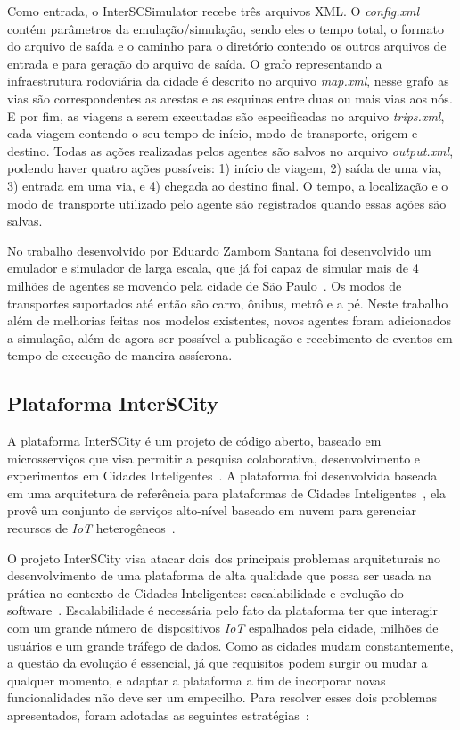 Como entrada, o InterSCSimulator recebe três arquivos XML. O \textit{config.xml} contém parâmetros da emulação/simulação, sendo eles o tempo total, o formato do
arquivo de saída e o caminho para o diretório contendo os outros arquivos de entrada e para geração do arquivo de saída.
O grafo representando a infraestrutura rodoviária da cidade é descrito no arquivo \textit{map.xml}, nesse grafo as vias são correspondentes as arestas e as esquinas entre
duas ou mais vias aos nós.
E por fim, as viagens a serem executadas são especificadas no arquivo \textit{trips.xml}, cada viagem contendo o seu tempo de início, modo de transporte, origem e destino.
Todas as ações realizadas pelos agentes são salvos no arquivo \textit{output.xml}, podendo haver quatro ações possíveis: 1) início de viagem, 2) saída de uma via,
3) entrada em uma via, e 4) chegada ao destino final.
O tempo, a localização e o modo de transporte utilizado pelo agente são registrados quando essas ações são salvas.

No trabalho desenvolvido por Eduardo Zambom Santana foi desenvolvido um emulador e simulador de larga escala, que já foi capaz de simular mais de 4 milhões de
agentes se movendo pela cidade de São Paulo~\cite{santana_17}.
Os modos de transportes suportados até então são carro, ônibus, metrô e a pé.
Neste trabalho além de melhorias feitas nos modelos existentes, novos agentes foram adicionados a simulação, além de agora ser possível a publicação e recebimento de
eventos em tempo de execução de maneira assícrona.

\subsection{Plataforma InterSCity}
\label{sec:interscity}

A plataforma InterSCity é um projeto de código aberto, baseado em microsserviços que visa permitir a pesquisa colaborativa, desenvolvimento e experimentos em Cidades
Inteligentes~\cite{arthur_17}.
A plataforma foi desenvolvida baseada em uma arquitetura de referência para plataformas de Cidades Inteligentes~\cite{santana_2016}, ela provê um conjunto de serviços
alto-nível baseado em nuvem para gerenciar recursos de \textit{IoT} heterogêneos~\cite{arthur_17}.

O projeto InterSCity visa atacar dois dos principais problemas arquiteturais no desenvolvimento de uma plataforma de alta qualidade que possa ser usada na prática no
contexto de Cidades Inteligentes: escalabilidade e evolução do software~\cite{arthur_17}.
Escalabilidade é necessária pelo fato da plataforma ter que interagir com um grande número de dispositivos \textit{IoT} espalhados pela cidade, milhões de usuários e
um grande tráfego de dados.
Como as cidades mudam constantemente, a questão da evolução é essencial, já que requisitos podem surgir ou mudar a qualquer momento, e adaptar a plataforma a fim de
incorporar novas funcionalidades não deve ser um empecilho.
Para resolver esses dois problemas apresentados, foram adotadas as seguintes estratégias~\cite{arthur_17}:

